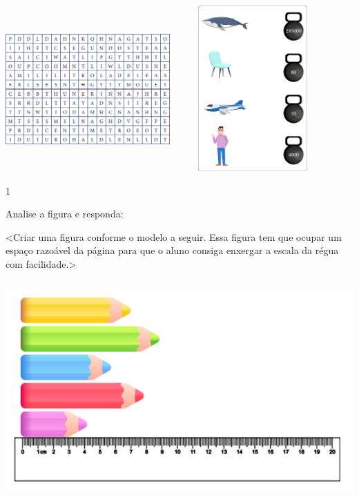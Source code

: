 {\includegraphics[width=2.47525in,height=2.47010in]{media/image40.png}\includegraphics[width=2.51046in,height=2.50000in]{media/image41.png}


\num{1}

Analise a figura e responda:

\textless{}Criar uma figura conforme o modelo a seguir. Essa figura tem
que ocupar um espaço razoável da página para que o aluno consiga
enxergar a escala da régua com facilidade.\textgreater{}

\includegraphics[width=5.76042in,height=3.32424in]{media/image42.png}

}
